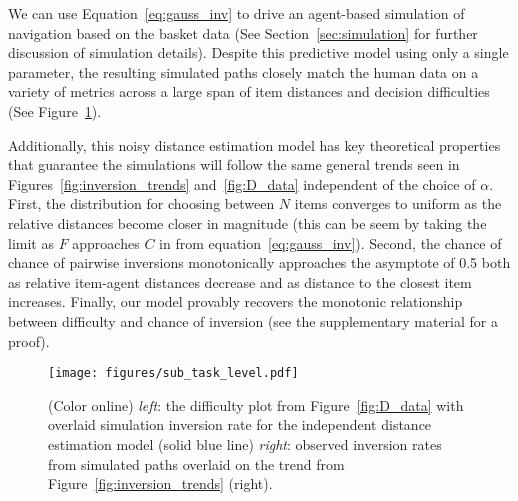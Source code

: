 \documentclass[aps,pre,twocolumn,groupedaddress]{revtex4-2}
\begin{document}
We can use Equation~\ref{eq:gauss_inv} to drive an agent-based simulation of navigation based on the basket data (See Section~\ref{sec:simulation} for further discussion of simulation details). Despite this predictive model using only a single parameter, the resulting simulated paths closely match the human data on a variety of metrics across a large span of item distances and decision difficulties (See Figure~\ref{fig:sub_task_level}).

Additionally, this noisy distance estimation model has key theoretical properties that guarantee the simulations will follow the same general trends seen in Figures~\ref{fig:inversion_trends} and~\ref{fig:D_data} independent of the choice of $\alpha$. First, the distribution for choosing between $N$ items converges to uniform as the relative distances become closer in magnitude (this can be seem by taking the limit as $F$ approaches $C$ in from equation~\ref{eq:gauss_inv}). Second, the chance of chance of pairwise inversions monotonically approaches the asymptote of 0.5 both as relative item-agent distances decrease and as distance to the closest item increases. Finally, our model provably recovers the monotonic relationship between difficulty and chance of inversion  (see the supplementary material for a proof).



\begin{figure}
    \centering
    \texttt{[image: figures/sub\_task\_level.pdf]}%
    \caption{(Color online) \textit{left}: the difficulty plot from Figure~\ref{fig:D_data} with overlaid simulation inversion rate for the independent distance estimation model (solid blue line)
    \textit{right}: observed inversion rates from simulated paths overlaid on the trend from Figure~\ref{fig:inversion_trends} (right). \label{fig:sub_task_level}}
\end{figure}
\end{document}
